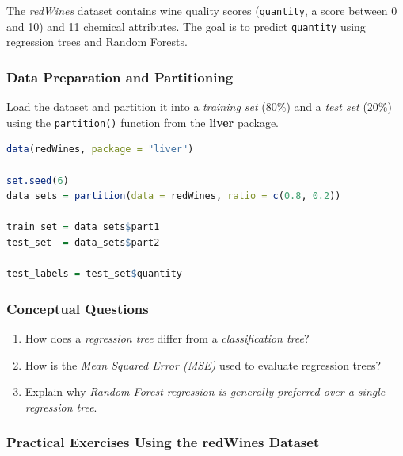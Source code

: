 \documentclass[
]{book}
\newcommand{\passthrough}[1]{#1}
\providecommand{\tightlist}{%
  \setlength{\itemsep}{0pt}\setlength{\parskip}{0pt}}
\theoremstyle{definition}
\theoremstyle{definition}
\theoremstyle{definition}
\theoremstyle{definition}
\theoremstyle{remark}
\begin{document}
The \emph{redWines} dataset contains wine quality scores (\passthrough{\lstinline!quantity!}, a score between 0 and 10) and 11 chemical attributes. The goal is to predict \passthrough{\lstinline!quantity!} using regression trees and Random Forests.

\subsubsection*{Data Preparation and Partitioning}\label{data-preparation-and-partitioning-1}

Load the dataset and partition it into a \emph{training set} (80\%) and a \emph{test set} (20\%) using the \passthrough{\lstinline!partition()!} function from the \textbf{liver} package.

\begin{lstlisting}[language=R]
data(redWines, package = "liver")

set.seed(6)
data_sets = partition(data = redWines, ratio = c(0.8, 0.2))

train_set = data_sets$part1
test_set  = data_sets$part2

test_labels = test_set$quantity
\end{lstlisting}

\subsubsection*{Conceptual Questions}\label{conceptual-questions-9}

\begin{enumerate}
\def\labelenumi{\arabic{enumi}.}
\setcounter{enumi}{37}
\tightlist
\item
  How does a \emph{regression tree} differ from a \emph{classification tree}?\\
\item
  How is the \emph{Mean Squared Error (MSE)} used to evaluate regression trees?\\
\item
  Explain why \emph{Random Forest regression is generally preferred over a single regression tree}.
\end{enumerate}

\subsubsection*{Practical Exercises Using the redWines Dataset}\label{practical-exercises-using-the-redwines-dataset}
\end{document}
